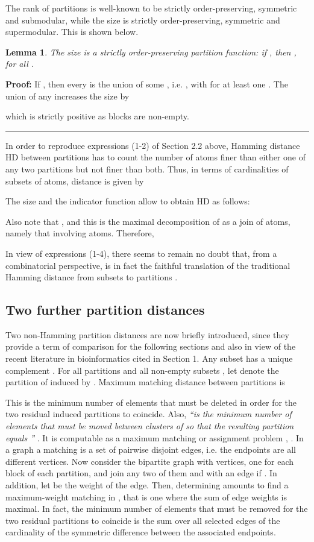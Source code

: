 \documentclass[a4paper,10pt]{article}
\newtheorem{lemma}[theorem]{Lemma}
\newenvironment{proof}[1][Proof]{\noindent\textbf{#1: }}{\ \rule{0.5em}{0.5em}}
\begin{document}
The rank  of partitions is well-known to be strictly order-preserving, symmetric and submodular, while the size  is strictly order-preserving, symmetric and
supermodular. This is shown below.

\begin{lemma}
The size is a strictly order-preserving partition function: if , then , for all .
\end{lemma}
\begin{proof}
If , then every  is the union of some , i.e. , with  for at least one . The
union  of any  increases the size by

which is strictly positive as blocks are non-empty.
\end{proof}

In order to reproduce expressions (1-2) of Section 2.2 above, Hamming distance HD between partitions has to count the number of atoms finer than either one of any two partitions
but not finer than both. Thus, in terms of cardinalities of subsets of atoms, distance  is given by

The size and the indicator function allow to obtain HD as follows:

Also note that , and this is the maximal decomposition of  as a join of atoms, namely that involving
 atoms. Therefore,

In view of expressions (1-4), there seems to remain no doubt that, from a combinatorial perspective,  is in fact the faithful translation of the traditional Hamming
distance  from subsets  to partitions .

\subsection{Two further partition distances}

Two non-Hamming partition distances are now briefly introduced, since they provide a term of comparison for the following sections and also in view of the recent literature in
bioinformatics cited in Section 1. Any subset  has a unique complement . For all partitions  and all non-empty subsets , let
 denote the partition of  induced by . Maximum matching distance  between partitions  is

This is the minimum number of elements  that must be deleted in order for the two residual induced partitions to coincide. Also,  \textit{``is the minimum number
of elements that must be moved between clusters of  so that the resulting partition equals ''} \cite[p. 160]{Gusfield2002}. It is computable as a maximum matching or
assignment problem \cite{Day1981}, \cite[chapter 11]{KorteVygen2002}. In a graph a matching is a set of pairwise disjoint edges, i.e. the endpoints are all different vertices. Now consider the
bipartite graph  with  vertices, one for each block of each partition, and join any two of them  and  with an edge  if
. In addition, let  be the weight of the edge. Then, determining  amounts to find a maximum-weight matching  in , that is one
where the sum  of edge weights is maximal. In fact, the minimum number  of elements that must be removed for the two residual partitions to
coincide is the sum  over all selected edges of the cardinality of the symmetric difference between the associated endpoints.
\end{document}
